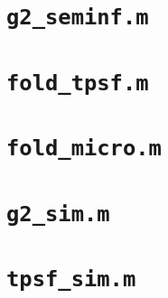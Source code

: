 \section{\texttt{g2\_seminf.m}} \label{code:g2}


\section{\texttt{fold\_tpsf.m}} \label{code:fold_tpsf}


\section{\texttt{fold\_micro.m}} \label{code:fold_micro}


\section{\texttt{g2\_sim.m}} \label{code:g2_sim}


\section{\texttt{tpsf\_sim.m}} \label{code:tpsf_sim}



\printbibliography[heading=bibintoc, title={References}]


%